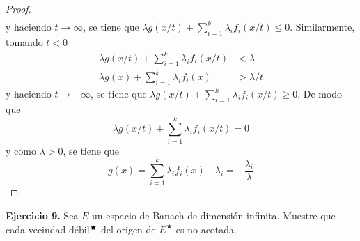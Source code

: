 \begin{proof}
\begin{align*}
\end{align*}
y haciendo $t\to \infty$, se tiene que $\lambda g(x/t)+\sum_{i=1}^{k}\lambda_if_i(x/t)\leq 0$. Similarmente, tomando $t<0$
\begin{align*}
    \lambda g(x/t)+\sum_{i=1}^{k}\lambda_if_i(x/t)&<\lambda \\
    \lambda g(x)+\sum_{i=1}^{k}\lambda_if_i(x)&>\lambda/t
\end{align*}
y haciendo $t\to -\infty$, se tiene que $\lambda g(x/t)+\sum_{i=1}^{k}\lambda_if_i(x/t)\geq 0$. De modo que
\[
\lambda g(x/t)+\sum_{i=1}^{k}\lambda_if_i(x/t)= 0
\]
y como $\lambda>0$, se tiene que
\[
g(x)=\sum_{i=1}^{k}\tilde{\lambda_i}f_i(x) \quad \tilde{\lambda_i}=-\frac{\lambda_i}{\lambda}
\]
\end{proof}




\textbf{Ejercicio 9.} Sea $E$ un espacio de Banach de dimensión infinita. Muestre que cada vecindad débil$\empty^\bigstar$ del origen de $E^\bigstar$ es no acotada.

